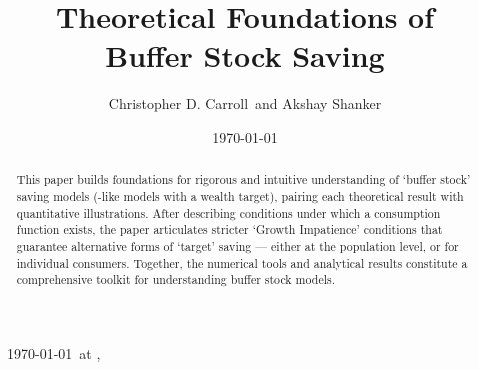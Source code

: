 \documentclass[BufferStockTheory]{subfiles}
\begin{document}


\hfill{\tiny \jobname~\versn~\today~{at} \DTMcurrenttime, ~~}

\title{Theoretical Foundations of \\ Buffer Stock Saving}

\author{Christopher D. Carroll\authNum ~and Akshay Shanker\authNum}



 \date{\today}

\maketitle
\hypertarget{abstract}{}
\begin{abstract}
  This paper builds foundations for rigorous and intuitive understanding of `buffer stock' saving models (\cite{bewleyPIH}-like models with a wealth target), pairing each theoretical result with quantitative illustrations.  After describing conditions under which a consumption function exists, the paper articulates stricter `Growth Impatience' conditions that guarantee alternative forms of `target' saving --- either at the population level, or for individual consumers.  Together, the numerical tools and analytical results constitute a comprehensive toolkit for understanding buffer stock models.
\end{abstract}

\hypertarget{links}{}
\end{document}
